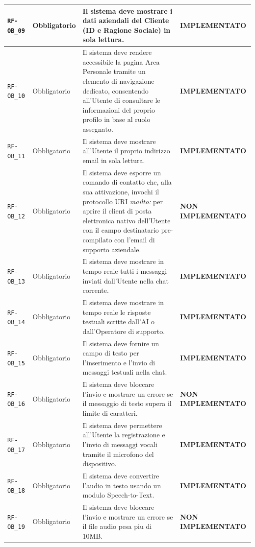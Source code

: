 \documentclass[a4paper, 11pt, oneside]{scrartcl}
\begin{document}
\begin{longtable}{|>{\raggedright\arraybackslash}p{}|>{\raggedright\arraybackslash}p{}|>{\raggedright\arraybackslash}p{}|>{\raggedright\arraybackslash}p{}|}
    \hline
    \texttt{RF-OB\_09} & Obbligatorio & Il sistema deve mostrare i dati aziendali del Cliente (ID e Ragione Sociale) in sola lettura. & \textbf{IMPLEMENTATO} \\
    \hline
    \texttt{RF-OB\_10} & Obbligatorio & Il sistema deve rendere accessibile la pagina Area Personale tramite un elemento di navigazione dedicato, consentendo all'Utente di consultare le informazioni del proprio profilo in base al ruolo assegnato. & \textbf{IMPLEMENTATO} \\
    \hline
    \texttt{RF-OB\_11} & Obbligatorio & Il sistema deve mostrare all'Utente il proprio indirizzo email in sola lettura. & \textbf{IMPLEMENTATO} \\
    \hline
    \texttt{RF-OB\_12} & Obbligatorio & Il sistema deve esporre un comando di contatto che, alla sua attivazione, invochi il protocollo URI \textit{mailto:} per aprire il client di posta elettronica nativo dell'Utente con il campo destinatario pre-compilato con l'email di supporto aziendale. & \textbf{NON IMPLEMENTATO} \\
    \hline
    \texttt{RF-OB\_13} & Obbligatorio & Il sistema deve mostrare in tempo reale tutti i messaggi inviati dall'Utente nella chat corrente. & \textbf{IMPLEMENTATO} \\
    \hline
    \texttt{RF-OB\_14} & Obbligatorio & Il sistema deve mostrare in tempo reale le risposte testuali scritte dall'AI o dall'Operatore di supporto. & \textbf{IMPLEMENTATO} \\
    \hline
    \texttt{RF-OB\_15} & Obbligatorio & Il sistema deve fornire un campo di testo per l'inserimento e l'invio di messaggi testuali nella chat. & \textbf{IMPLEMENTATO} \\
    \hline
    \texttt{RF-OB\_16} & Obbligatorio & Il sistema deve bloccare l'invio e mostrare un errore se il messaggio di testo supera il limite di caratteri. & \textbf{NON IMPLEMENTATO} \\
    \hline
    \texttt{RF-OB\_17} & Obbligatorio & Il sistema deve permettere all'Utente la registrazione e l'invio di messaggi vocali tramite il microfono del dispositivo. & \textbf{IMPLEMENTATO} \\
    \hline
    \texttt{RF-OB\_18} & Obbligatorio & Il sistema deve convertire l'audio in testo usando un modulo Speech-to-Text. & \textbf{IMPLEMENTATO} \\
    \hline
    \texttt{RF-OB\_19} & Obbligatorio & Il sistema deve bloccare l'invio e mostrare un errore se il file audio pesa piu di 10MB. & \textbf{NON IMPLEMENTATO} \\

\end{longtable}
\end{document}
